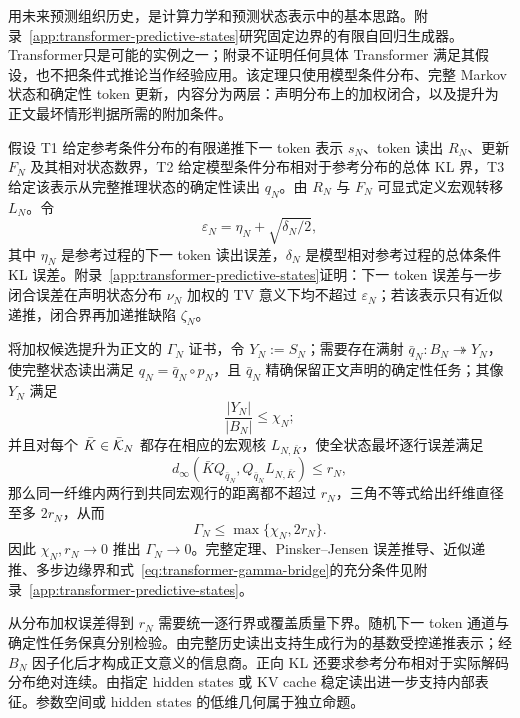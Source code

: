 用未来预测组织历史，是计算力学和预测状态表示中的基本思路\citep{CrutchfieldYoung1989,ShaliziCrutchfield2001,LittmanSuttonSingh2001}。附录~\ref{app:transformer-predictive-states}研究固定边界的有限自回归生成器。Transformer\citep{VaswaniEtAl2017}只是可能的实例之一；附录不证明任何具体 Transformer 满足其假设，也不把条件式推论当作经验应用。该定理只使用模型条件分布、完整 Markov 状态和确定性 token 更新，内容分为两层：声明分布上的加权闭合，以及提升为正文最坏情形判据所需的附加条件。

假设 T1 给定参考条件分布的有限递推下一 token 表示 $s_N$、token 读出 $R_N$、更新 $F_N$ 及其相对状态数界，T2 给定模型条件分布相对于参考分布的总体 KL 界，T3 给定该表示从完整推理状态的确定性读出 $q_N$。由 $R_N$ 与 $F_N$ 可显式定义宏观转移 $L_N$。令
\[
\varepsilon_N=\eta_N+\sqrt{\delta_N/2},
\]
其中 $\eta_N$ 是参考过程的下一 token 读出误差，$\delta_N$ 是模型相对参考过程的总体条件 KL 误差。附录~\ref{app:transformer-predictive-states}证明：下一 token 误差与一步闭合误差在声明状态分布 $\nu_N$ 加权的 TV 意义下均不超过 $\varepsilon_N$；若该表示只有近似递推，闭合界再加递推缺陷 $\zeta_N$。

将加权候选提升为正文的 $\Gamma_N$ 证书，令 $Y_N:=S_N$；需要存在满射 $\bar q_N:B_N\twoheadrightarrow Y_N$，使完整状态读出满足 $q_N=\bar q_N\circ p_N$，且 $\bar q_N$ 精确保留正文声明的确定性任务；其像 $Y_N$ 满足
\[
\frac{|Y_N|}{|B_N|}\le \chi_N;
\]
并且对每个 $\bar K\in\bar{\mathcal K}_N$ 都存在相应的宏观核 $L_{N,\bar K}$，使全状态最坏逐行误差满足
\[
d_\infty(\bar KQ_{\bar q_N},Q_{\bar q_N}L_{N,\bar K})\le r_N,
\]
那么同一纤维内两行到共同宏观行的距离都不超过 $r_N$，三角不等式给出纤维直径至多 $2r_N$，从而
\begin{equation}
\Gamma_N\le\max\{\chi_N,2r_N\}.
\label{eq:transformer-gamma-bridge}
\end{equation}
因此 $\chi_N,r_N\to0$ 推出 $\Gamma_N\to0$。完整定理、Pinsker--Jensen 误差推导、近似递推、多步边缘界和式~\eqref{eq:transformer-gamma-bridge}的充分条件见附录~\ref{app:transformer-predictive-states}。

从分布加权误差得到 $r_N$ 需要统一逐行界或覆盖质量下界。随机下一 token 通道与确定性任务保真分别检验。由完整历史读出支持生成行为的基数受控递推表示；经 $B_N$ 因子化后才构成正文意义的信息商。正向 KL 还要求参考分布相对于实际解码分布绝对连续。由指定 hidden states 或 KV cache 稳定读出进一步支持内部表征。参数空间或 hidden states 的低维几何属于独立命题。
